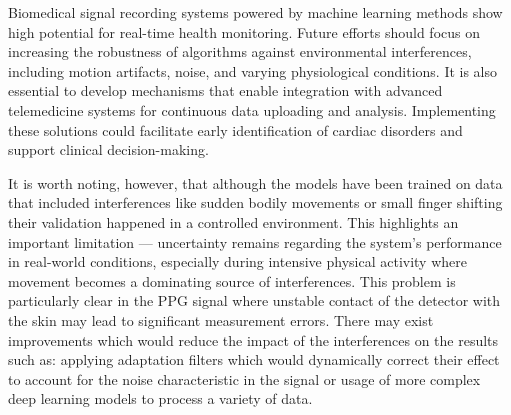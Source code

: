 \documentclass[journal]{IEEEtran}
\begin{document}
Biomedical signal recording systems powered by machine learning methods show high potential for real-time health monitoring. Future efforts should focus on increasing the robustness of algorithms against environmental interferences, including motion artifacts, noise, and varying physiological conditions. It is also essential to develop mechanisms that enable integration with advanced telemedicine systems for continuous data uploading and analysis. Implementing these solutions could facilitate early identification of cardiac disorders and support clinical decision-making.

It is worth noting, however, that although the models have been trained on data that included interferences like sudden bodily movements or small finger shifting their validation happened in a controlled environment. This highlights an important limitation — uncertainty remains regarding the system’s performance in real-world conditions, especially during intensive physical activity where movement becomes a dominating source of interferences. This problem is particularly clear in the PPG signal where unstable contact of the detector with the skin may lead to significant measurement errors. There may exist improvements which would reduce the impact of the interferences on the results such as: applying adaptation filters which would dynamically correct their effect to account for the noise characteristic in the signal or usage of more complex deep learning models to process a variety of data.
\end{document}
